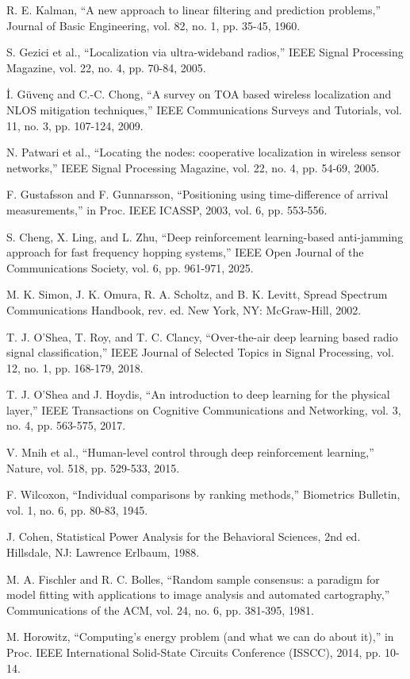  R. E. Kalman, ``A new approach to linear filtering and prediction problems,'' Journal of Basic Engineering, vol. 82, no. 1, pp. 35-45, 1960.

 S. Gezici et al., ``Localization via ultra-wideband radios,'' IEEE Signal Processing Magazine, vol. 22, no. 4, pp. 70-84, 2005.

 \.{I}. Güvenç and C.-C. Chong, ``A survey on TOA based wireless localization and NLOS mitigation techniques,'' IEEE Communications Surveys and Tutorials, vol. 11, no. 3, pp. 107-124, 2009.

 N. Patwari et al., ``Locating the nodes: cooperative localization in wireless sensor networks,'' IEEE Signal Processing Magazine, vol. 22, no. 4, pp. 54-69, 2005.

 F. Gustafsson and F. Gunnarsson, ``Positioning using time-difference of arrival measurements,'' in Proc. IEEE ICASSP, 2003, vol. 6, pp. 553-556.

 S. Cheng, X. Ling, and L. Zhu, ``Deep reinforcement learning-based anti-jamming approach for fast frequency hopping systems,'' IEEE Open Journal of the Communications Society, vol. 6, pp. 961-971, 2025.

 M. K. Simon, J. K. Omura, R. A. Scholtz, and B. K. Levitt, Spread Spectrum Communications Handbook, rev. ed. New York, NY: McGraw-Hill, 2002.

 T. J. O'Shea, T. Roy, and T. C. Clancy, ``Over-the-air deep learning based radio signal classification,'' IEEE Journal of Selected Topics in Signal Processing, vol. 12, no. 1, pp. 168-179, 2018.

 T. J. O'Shea and J. Hoydis, ``An introduction to deep learning for the physical layer,'' IEEE Transactions on Cognitive Communications and Networking, vol. 3, no. 4, pp. 563-575, 2017.

 V. Mnih et al., ``Human-level control through deep reinforcement learning,'' Nature, vol. 518, pp. 529-533, 2015.

 F. Wilcoxon, ``Individual comparisons by ranking methods,'' Biometrics Bulletin, vol. 1, no. 6, pp. 80-83, 1945.

 J. Cohen, Statistical Power Analysis for the Behavioral Sciences, 2nd ed. Hillsdale, NJ: Lawrence Erlbaum, 1988.

 M. A. Fischler and R. C. Bolles, ``Random sample consensus: a paradigm for model fitting with applications to image analysis and automated cartography,'' Communications of the ACM, vol. 24, no. 6, pp. 381-395, 1981.

 M. Horowitz, ``Computing's energy problem (and what we can do about it),'' in Proc. IEEE International Solid-State Circuits Conference (ISSCC), 2014, pp. 10-14.
